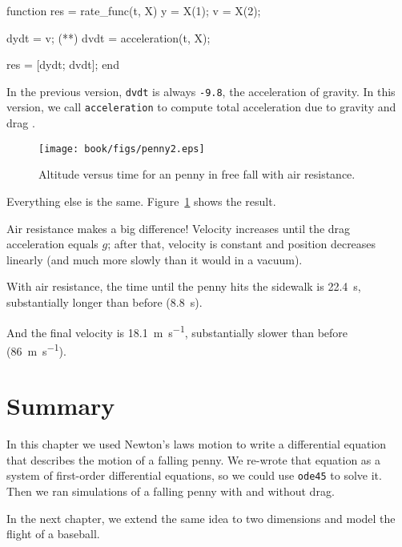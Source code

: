 \begin{code}
function res = rate_func(t, X)
    y = X(1);      
    v = X(2);      
    
    dydt = v;
(**)    dvdt = acceleration(t, X);   %

    res = [dydt; dvdt];
end

\end{code}

In the previous version, {\tt dvdt} is always {\tt -9.8}, the acceleration of gravity.
In this version, we call {\tt acceleration} to compute total acceleration due to gravity and drag .

\begin{figure}[ht]
\centerline{\texttt{[image: book/figs/penny2.eps]}}
\caption{Altitude versus time for an penny in free fall with air resistance.}
\label{fig:penny2}
\end{figure}

Everything else is the same.  Figure~\ref{fig:penny2} shows the result. 

Air resistance makes a big difference!  Velocity increases until
the drag acceleration equals $g$; after that, velocity is constant and position decreases linearly (and much more slowly than it would in a vacuum).

With air resistance, the time until the penny hits the sidewalk is \SI{22.4}{\second}, substantially longer than before (\SI{8.8}{\second}).

And the final velocity is \SI{18.1}{\meter \per \second}, substantially slower than before (\SI{86}{\meter \per \second}).

\section{Summary}

In this chapter we used Newton's laws motion to write a differential equation that describes the motion of a falling penny.  We re-wrote that equation as a system of first-order differential equations, so we could use {\tt ode45} to solve it.  Then we ran simulations of a falling penny with and without drag.

In the next chapter, we extend the same idea to two dimensions and model the flight of a baseball.


%
%
%
%


